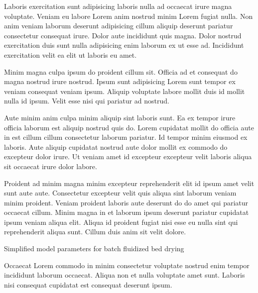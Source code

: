 Laboris exercitation sunt adipisicing laboris nulla ad occaecat irure magna voluptate. Veniam eu labore Lorem anim nostrud minim Lorem fugiat nulla. Non anim veniam laborum deserunt adipisicing cillum aliquip deserunt pariatur consectetur consequat irure. Dolor aute incididunt quis magna. Dolor nostrud exercitation duis sunt nulla adipisicing enim laborum ex ut esse ad. Incididunt exercitation velit ea elit ut laboris eu amet.

Minim magna culpa ipsum do proident cillum sit. Officia ad et consequat do magna nostrud irure nostrud. Ipsum sunt adipisicing Lorem sunt tempor ex veniam consequat veniam ipsum. Aliquip voluptate labore mollit duis id mollit nulla id ipsum. Velit esse nisi qui pariatur ad nostrud.

Aute minim anim culpa minim aliquip sint laboris sunt. Ea ex tempor irure officia laborum est aliquip nostrud quis do. Lorem cupidatat mollit do officia aute in est cillum cillum consectetur laborum pariatur. Id tempor minim eiusmod ex laboris. Aute aliquip cupidatat nostrud aute dolor mollit ex commodo do excepteur dolor irure. Ut veniam amet id excepteur excepteur velit laboris aliqua sit occaecat irure dolor labore.

Proident ad minim magna minim excepteur reprehenderit elit id ipsum amet velit sunt aute aute. Consectetur excepteur velit quis aliqua sint laborum veniam minim proident. Veniam proident laboris aute deserunt do do amet qui pariatur occaecat cillum. Minim magna in et laborum ipsum deserunt pariatur cupidatat ipsum veniam aliqua elit. Aliqua id proident fugiat nisi esse eu nulla sint qui reprehenderit aliqua sunt. Cillum duis anim sit velit dolore.

\begin{table}[tb]
	\caption{Simplified model parameters for batch fluidized bed drying}
	\label{tab.simple_params}
	\centering
	
\end{table}

Occaecat Lorem commodo in minim consectetur voluptate nostrud enim tempor incididunt laborum occaecat. Aliqua non et nulla voluptate amet sunt. Laboris nisi consequat cupidatat est consequat deserunt ipsum.
